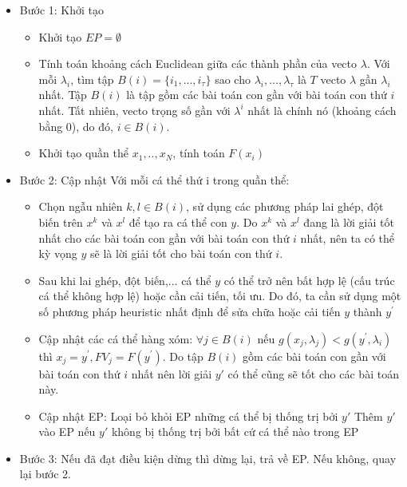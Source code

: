 \documentclass{article}
\begin{document}
\begin{itemize}
    \item Bước 1: Khởi tạo
    \begin{itemize}
        \item Khởi tạo $EP = \emptyset$
        \item Tính toán khoảng cách Euclidean giữa các thành phần của vecto $\lambda$. Với mỗi $\lambda_i$, tìm tập $B(i) = \{i_1,..., i_\tau\} $ sao cho $\lambda_i,..., \lambda_\tau$ là $T$ vecto $\lambda$ gần $\lambda_i$ nhất. Tập $B(i)$ là tập gồm các bài toán con gần với bài toán con thứ $i$ nhất. Tất nhiên, vecto trọng số gần với $\lambda^i$ nhất là chính nó (khoảng cách bằng $0$), do đó, $i \in B(i)$. 
        \item Khởi tạo quần thể $x_1,.., x_N$, tính toán $F(x_i)$
    \end{itemize}
    \item Bước 2: Cập nhật
    Với mỗi cá thể thứ i trong quần thể:
    \begin{itemize}
        \item Chọn ngẫu nhiên $k, l \in B(i)$, sử dụng các phương pháp lai ghép, đột biến trên $x^k$ và $x^l$ để tạo ra cá thể con $y$. Do $x^k$ và $x^l$ đang là lời giải tốt nhất cho các bài toán con gần với bài toán con thứ $i$ nhất, nên ta có thể kỳ vọng $y$ sẽ là lời giải tốt cho bài toán con thứ $i$.
        \item Sau khi lai ghép, đột biến,... cá thể $y$ có thể trở nên bất hợp lệ (cấu trúc cá thể không hợp lệ) hoặc cần cải tiến, tối ưu. Do đó, ta cần sử dụng một số phương pháp heuristic nhất định để sửa chữa hoặc cải tiến $y$ thành  $y^{'}$
        \item Cập nhật các cá thể hàng xóm: $\forall j \in B(i) \text{ nếu } g(x_j, \lambda_j) < g(y^{'}, \lambda_i)$ thì $x_j = y^{'}, FV_j = F(y^{'})$. Do tập $B(i)$ gồm các bài toán con gần với bài toán con thứ $i$ nhất nên lời giải $y{'}$ có thể cũng sẽ tốt cho các bài toán này.
        \item Cập nhật EP: 
        \newline Loại bỏ khỏi EP những cá thể bị thống trị bởi $y{'}$
        \newline Thêm $y{'}$ vào EP nếu $y{'}$ không bị thống trị bởi bất cứ cá thể nào trong EP
    \end{itemize}
    \item Bước 3: Nếu đã đạt điều kiện dừng thì dừng lại, trả về EP. Nếu không, quay lại bước 2.
\end{itemize}
\end{document}
